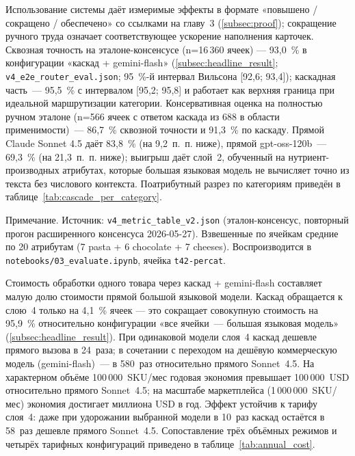 Использование системы даёт измеримые эффекты в формате «повышено / сокращено / обеспечено» со ссылками на главу~3 (\ref{subsec:proof}); сокращение ручного труда означает соответствующее ускорение наполнения карточек. Сквозная точность на эталоне-консенсусе (n=16\,360 ячеек) — 93,0~\% в конфигурации «каскад + gemini-flash» (\ref{subsec:headline_result}; \texttt{v4\_e2e\_router\_eval.json}; 95~\%-й интервал Вильсона [92,6; 93,4]); каскадная часть~--- 95,5~\% с интервалом [95,2; 95,8] и работает как верхняя граница при идеальной маршрутизации категории. Консервативная оценка на полностью ручном эталоне (n=566 ячеек с ответом каскада из 688 в области применимости)~--- 86,7~\% сквозной точности и 91,3~\% по каскаду. Прямой Claude Sonnet 4.5 даёт 83,8~\% (на 9,2~п.~п. ниже), прямой gpt-oss-120b~--- 69,3~\% (на 21,3~п.~п. ниже); выигрыш даёт слой~2, обученный на нутриент-производных атрибутах, которые большая языковая модель не вычисляет точно из текста без числового контекста. Поатрибутный разрез по категориям приведён в таблице~\ref{tab:cascade_per_category}.



Примечание. Источник: \texttt{v4\_metric\_table\_v2.json} (эталон-консенсус, повторный прогон расширенного консенсуса 2026-05-27). Взвешенные по ячейкам средние по 20 атрибутам (7 pasta + 6 chocolate + 7 cheeses). Воспроизводится в \texttt{notebooks/03\_evaluate.ipynb}, ячейка \texttt{t42-percat}.

Стоимость обработки одного товара через каскад + gemini-flash составляет малую долю стоимости прямой большой языковой модели. Каскад обращается к слою~4 только на 4,1~\% ячеек — это сокращает совокупную стоимость на 95,9~\% относительно конфигурации «все ячейки~--- большая языковая модель» (\ref{subsec:headline_result}). При одинаковой модели слоя~4 каскад дешевле прямого вызова в 24~раза; в сочетании с переходом на дешёвую коммерческую модель (gemini-flash)~--- в 580~раз относительно прямого Sonnet~4.5. На характерном объёме 100\,000~SKU/мес годовая экономия превышает 100\,000~USD относительно прямого Sonnet~4.5; на масштабе маркетплейса (1\,000\,000~SKU/мес) экономия достигает миллиона USD в год. Эффект устойчив к тарифу слоя~4: даже при удорожании выбранной модели в 10~раз каскад остаётся в 58~раз дешевле прямого Sonnet~4.5. Сопоставление трёх объёмных режимов и четырёх тарифных конфигураций приведено в таблице~\ref{tab:annual_cost}.

